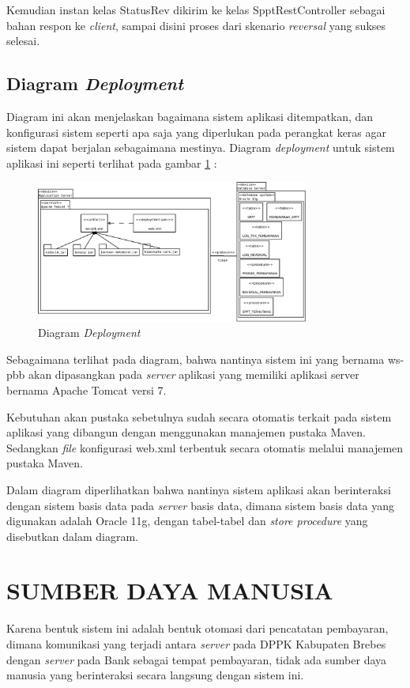 \documentclass[pdftex,12pt, oneside]{article}
\begin{document}
Kemudian instan kelas StatusRev dikirim ke kelas SpptRestController sebagai bahan respon ke \textit{client}, sampai disini proses dari skenario \textit{reversal} yang sukses selesai.

\subsection{Diagram \textit{Deployment}}

Diagram ini akan menjelaskan bagaimana sistem aplikasi ditempatkan, dan konfigurasi sistem seperti apa saja yang diperlukan pada perangkat keras agar sistem dapat berjalan sebagaimana mestinya. Diagram \textit{deployment} untuk sistem aplikasi ini seperti terlihat pada gambar \ref{fig:uml-deployment} :

\begin{figure}[H]
  \centering
  \includegraphics[width=0.8\textwidth]{./resources/diagram/uml-deployment}
  \caption{Diagram \textit{Deployment}}
  \label{fig:uml-deployment}
\end{figure}

Sebagaimana terlihat pada diagram, bahwa nantinya sistem ini yang bernama ws-pbb akan dipasangkan pada \textit{server} aplikasi yang memiliki aplikasi server bernama Apache Tomcat versi 7.

Kebutuhan akan pustaka sebetulnya sudah secara otomatis terkait pada sistem aplikasi yang dibangun dengan menggunakan manajemen pustaka Maven. Sedangkan \textit{file} konfigurasi web.xml terbentuk secara otomatis melalui manajemen pustaka Maven.

Dalam diagram diperlihatkan bahwa nantinya sistem aplikasi akan berinteraksi dengan sistem basis data pada \textit{server} basis data, dimana sistem basis data yang digunakan adalah Oracle 11g, dengan tabel-tabel dan \textit{store procedure} yang disebutkan dalam diagram.

\section{SUMBER DAYA MANUSIA}

Karena bentuk sistem ini adalah bentuk otomasi dari pencatatan pembayaran, dimana komunikasi yang terjadi antara \textit{server} pada DPPK Kabupaten Brebes dengan \textit{server} pada Bank sebagai tempat pembayaran, tidak ada sumber daya manusia yang berinteraksi secara langsung dengan sistem ini.
\end{document}
